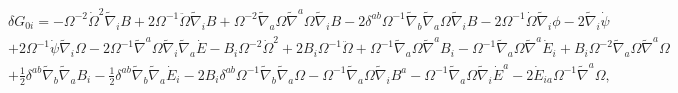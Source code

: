 \documentclass[aps]{revtex4}
\begin{document}
\begin{eqnarray}
&&\delta G_{0i}=- \Omega^{-2} \dot{\Omega}^2 \tilde{\nabla}_{i}B + 2 \Omega^{-1} \ddot{\Omega} \tilde{\nabla}_{i}B + \Omega^{-2} \tilde{\nabla}_{a}\Omega \tilde{\nabla}^{a}\Omega \tilde{\nabla}_{i}B - 2 \delta^{ab} \Omega^{-1} \tilde{\nabla}_{b}\tilde{\nabla}_{a}\Omega \tilde{\nabla}_{i}B - 2 \Omega^{-1} \dot{\Omega} \tilde{\nabla}_{i}\phi - 2 \tilde{\nabla}_{i}\dot{\psi} 
\nonumber\\
&&+ 2 \Omega^{-1} \dot{\psi} \tilde{\nabla}_{i}\Omega 
- 2 \Omega^{-1} \tilde{\nabla}^{a}\Omega \tilde{\nabla}_{i}\tilde{\nabla}_{a}\dot{E}
- B_{i} \Omega^{-2} \dot{\Omega}^2 + 2 B_{i} \Omega^{-1} \ddot{\Omega} + \Omega^{-1} \tilde{\nabla}_{a}\Omega \tilde{\nabla}^{a}B_{i} -  \Omega^{-1} \tilde{\nabla}_{a}\Omega \tilde{\nabla}^{a}\dot{E}_{i} + B_{i} \Omega^{-2} \tilde{\nabla}_{a}\Omega \tilde{\nabla}^{a}\Omega 
\nonumber\\
&&+ \tfrac{1}{2} \delta^{ab} \tilde{\nabla}_{b}\tilde{\nabla}_{a}B_{i}
 -  \tfrac{1}{2} \delta^{ab} \tilde{\nabla}_{b}\tilde{\nabla}_{a}\dot{E}_{i} - 2 B_{i} \delta^{ab} \Omega^{-1} \tilde{\nabla}_{b}\tilde{\nabla}_{a}\Omega -  \Omega^{-1} \tilde{\nabla}_{a}\Omega \tilde{\nabla}_{i}B^{a} -  \Omega^{-1} \tilde{\nabla}_{a}\Omega \tilde{\nabla}_{i}\dot{E}^{a}
-2 \dot{E}_{ia} \Omega^{-1} \tilde{\nabla}^{a}\Omega,
\label{C2}
\end{eqnarray}
%
%
\end{document}

